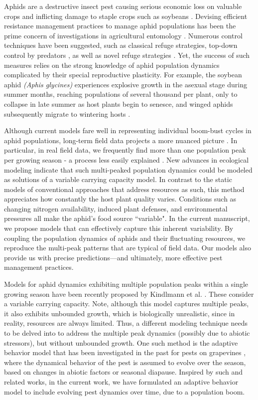 \documentclass[sn-mathphys-num]{sn-jnl}
\numberwithin{equation}{section}
\numberwithin{equation}{section}
\begin{document}
Aphids are a destructive insect pest causing serious economic loss on valuable crops and inflicting damage to staple crops such as soybeans \cite{catangui2009soybean, kindlmann2010modelling}. Devising efficient resistance management practices to manage aphid populations has been the prime concern of investigations in agricultural entomology \cite{Tabashnik2013, dean2021developing}. Numerous control techniques have been suggested, such as classical refuge strategies, top-down control by predators \cite{r1}, as well as novel refuge strategies \cite{toab218}. Yet, the success of such measures relies on the strong knowledge of aphid population dynamics complicated by their special reproductive plasticity. For example, the soybean aphid \emph{(Aphis glycines)} experiences explosive growth in the asexual stage during summer months, reaching populations of several thousand per plant, only to collapse in late summer as host plants begin to senesce, and winged aphids subsequently migrate to wintering hosts \cite{ragsdale2004soybean, ragsdale2011ecology, tilmon2011biology}.

Although current models fare well in representing individual boom-bust cycles in aphid populations, long-term field data projects a more nuanced picture \cite{costamagna2007exponential, matis2007stochastic,matis2009population}. In particular, in real field data, we frequently find more than one population peak per growing season - a process less easily explained \cite{K07, D90}. New advances in ecological modeling indicate that such multi-peaked population dynamics could be modeled as solutions of a variable carrying capacity model. In contrast to the static models of conventional approaches that address resources as such, this method appreciates how constantly the host plant quality varies. Conditions such as changing nitrogen availability, induced plant defenses, and environmental pressures all make the aphid's food source ``variable".
In the current manuscript, we propose models that can effectively capture this inherent variability. By coupling the population dynamics of aphids and their fluctuating resources, we reproduce the multi-peak patterns that are typical of field data. Our models also provide us with precise predictions—and ultimately, more effective pest management practices.

Models for aphid dynamics exhibiting multiple population peaks within a single growing season have been recently proposed by Kindlmann et al. \cite{DD20}. These consider a variable carrying capacity. Note, although this model captures multiple peaks, it also exhibits unbounded growth, which is biologically unrealistic, since in reality, resources are always limited. Thus, a different modeling technique needs to be delved into to address the multiple peak dynamics (possibly due to abiotic stressors), but without unbounded growth. One such method is the adaptive behavior model that has been investigated in the past for pests on grapevines  \cite{ainseba2023}, where the dynamical behavior of the pest is assumed to evolve over the season, based on changes in abiotic factors or seasonal diapause. Inspired by such and related works, in the current work, we have formulated an adaptive behavior model to include evolving pest dynamics over time, due to a population boom.
\end{document}
